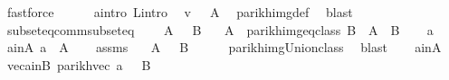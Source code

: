\begin{isabellebody}
\ fastforce\isanewline
\ \ \ \ \isamarkupfalse%
\ a{\isacharunderscore}{\kern0pt}intro\ L{\isacharunderscore}{\kern0pt}intro\ \isamarkupfalse%
\ {\isachardoublequoteopen}v\ {\isasymin}\ {\isasymPsi}\ A{\isachardoublequoteclose}\ \isamarkupfalse%
\ parikh{\isacharunderscore}{\kern0pt}img{\isacharunderscore}{\kern0pt}def\ \isamarkupfalse%
\ blast\isanewline
\ \ \isamarkupfalse%
\isanewline
{}\isamarkupfalse%
%
\endisatagproof
{\isafoldproof}%
%
\isadelimproof
\isanewline
%
\endisadelimproof
\isanewline
{}\isamarkupfalse%
\ subseteq{\isacharunderscore}{\kern0pt}comm{\isacharunderscore}{\kern0pt}subseteq{\isacharcolon}{\kern0pt}\isanewline
\ \ \ {\isachardoublequoteopen}{\isasymPsi}\ A\ {\isasymsubseteq}\ {\isasymPsi}\ B{\isachardoublequoteclose}\isanewline
\ \ \ {\isachardoublequoteopen}A\ {\isasymsubseteq}\ {\isasymUnion}{\isacharparenleft}{\kern0pt}parikh{\isacharunderscore}{\kern0pt}img{\isacharunderscore}{\kern0pt}eq{\isacharunderscore}{\kern0pt}class\ B{\isacharparenright}{\kern0pt}{\isachardoublequoteclose}\ {\isacharparenleft}{\kern0pt}\ {\isachardoublequoteopen}A\ {\isasymsubseteq}\ {\isacharquery}{\kern0pt}B{\isacharprime}{\kern0pt}{\isachardoublequoteclose}{\isacharparenright}{\kern0pt}\isanewline
%
\isadelimproof
%
\endisadelimproof
%
\isatagproof
{}\isamarkupfalse%
\isanewline
\ \ \isamarkupfalse%
\ a\isanewline
\ \ \isamarkupfalse%
\ a{\isacharunderscore}{\kern0pt}in{\isacharunderscore}{\kern0pt}A{\isacharcolon}{\kern0pt}\ {\isachardoublequoteopen}a\ {\isasymin}\ A{\isachardoublequoteclose}\isanewline
\ \ \isamarkupfalse%
\ assms\ \isamarkupfalse%
\ {\isachardoublequoteopen}{\isasymPsi}\ A\ {\isasymsubseteq}\ {\isasymPsi}\ {\isacharquery}{\kern0pt}B{\isacharprime}{\kern0pt}{\isachardoublequoteclose}\isanewline
\ \ \ \ \isamarkupfalse%
\ parikh{\isacharunderscore}{\kern0pt}img{\isacharunderscore}{\kern0pt}Union{\isacharunderscore}{\kern0pt}class\ \isamarkupfalse%
\ blast\isanewline
\ \ \isamarkupfalse%
\ a{\isacharunderscore}{\kern0pt}in{\isacharunderscore}{\kern0pt}A\ \isamarkupfalse%
\ vec{\isacharunderscore}{\kern0pt}a{\isacharunderscore}{\kern0pt}in{\isacharunderscore}{\kern0pt}B{\isacharprime}{\kern0pt}{\isacharcolon}{\kern0pt}\ {\isachardoublequoteopen}parikh{\isacharunderscore}{\kern0pt}vec\ a\ {\isasymin}\ {\isasymPsi}\ {\isacharquery}{\kern0pt}B{\isacharprime}{\kern0pt}{\isachardoublequoteclose}\ \isamarkupfalse%

\end{isabellebody}
